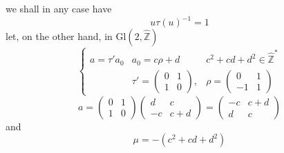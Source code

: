 \margin{$\unsure{\wedge}$}


we shall in any case have
\[
u\tau(u)^{-1}=1
\]
let, on the other hand, in $\mathrm{Gl}(2,\widehat{\mathbb Z})$
\[
\tag{96}
\left\{\begin{array}{lll}
a=\tau'a_0&a_0=c\rho+d&c^2+cd+d^2\in\widehat{\mathbb Z}^{*}\\[3pt]
&\tau'=\begin{pmatrix}0&1\\1&0\end{pmatrix},&
\rho=\begin{pmatrix}0&1\\-1&1\end{pmatrix}
\end{array}\right.
\]
\[
\tag{97}
a=\begin{pmatrix}0&1\\1&0\end{pmatrix}
\begin{pmatrix}d&c\\-c&c+d\end{pmatrix}
=\begin{pmatrix}-c&c+d\\d&c\end{pmatrix}
\]
and
\[
\tag{98}
\mu=-(c^2+cd+d^2)
\]


